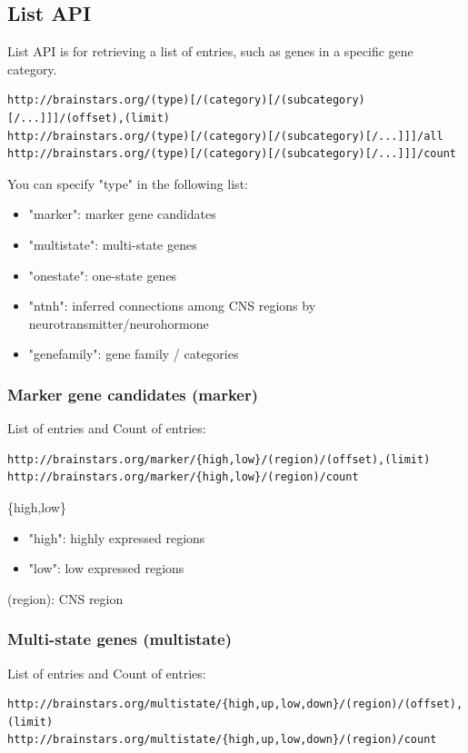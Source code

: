 \documentclass[12pt,fullpage]{article}
\begin{document}
\subsection{List API}
List API is for retrieving a list of entries, such as genes in a specific gene category.

\begin{verbatim}
http://brainstars.org/(type)[/(category)[/(subcategory)[/...]]]/(offset),(limit)
http://brainstars.org/(type)[/(category)[/(subcategory)[/...]]]/all 
http://brainstars.org/(type)[/(category)[/(subcategory)[/...]]]/count
\end{verbatim}

You can specify "type" in the following list:
\begin{itemize}
  \item "marker": marker gene candidates
  \item "multistate": multi-state genes
  \item "onestate": one-state genes
  \item "ntnh": inferred connections among CNS regions by neurotransmitter/neurohormone
  \item "genefamily": gene family / categories
\end{itemize}

\subsubsection{Marker gene candidates (marker)}
List of entries and Count of entries: 
\begin{verbatim}
http://brainstars.org/marker/{high,low}/(region)/(offset),(limit) 
http://brainstars.org/marker/{high,low}/(region)/count 
\end{verbatim}

\begin{description}
  \item{\{high,low\}}
    \begin{itemize}
      \item "high": highly expressed regions
      \item "low": low expressed regions
    \end{itemize}        
  \item (region): CNS region
\end{description}    

\subsubsection{Multi-state genes (multistate)}
List of entries and Count of entries: 
\begin{verbatim}
http://brainstars.org/multistate/{high,up,low,down}/(region)/(offset),(limit) 
http://brainstars.org/multistate/{high,up,low,down}/(region)/count 
\end{verbatim}
\end{document}
